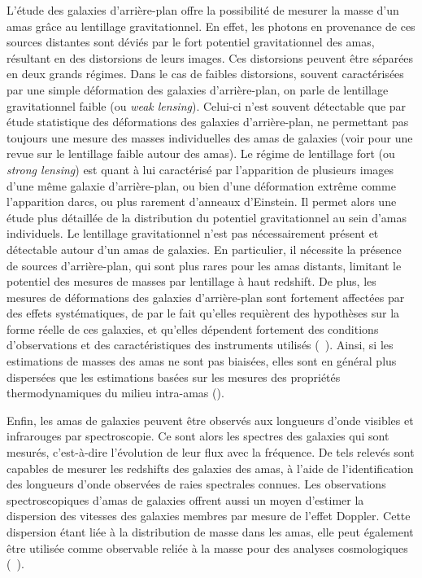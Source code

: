 L'étude des galaxies d'arrière-plan offre la possibilité de mesurer la masse d'un amas grâce au lentillage gravitationnel.
En effet, les photons en provenance de ces sources distantes sont déviés par le fort potentiel gravitationnel des amas, résultant en des distorsions de leurs images.
Ces distorsions peuvent être séparées en deux grands régimes.
Dans le cas de faibles distorsions, souvent caractérisées par une simple déformation des galaxies d'arrière-plan, on parle de lentillage gravitationnel faible (ou \textit{weak lensing}).
Celui-ci n'est souvent détectable que par étude statistique des déformations des galaxies d'arrière-plan, ne permettant pas toujours une mesure des masses individuelles des amas de galaxies (voir \cite{umetsu_clustergalaxy_2020} pour une revue sur le lentillage faible autour des amas).
Le régime de lentillage fort (ou \textit{strong lensing}) est quant à lui caractérisé par l'apparition de plusieurs images d'une même galaxie d'arrière-plan, ou bien d'une déformation extrême comme l'apparition darcs, ou plus rarement d'anneaux d'Einstein.
Il permet alors une étude plus détaillée de la distribution du potentiel gravitationnel au sein d'amas individuels.
Le lentillage gravitationnel n'est pas nécessairement présent et détectable autour d'un amas de galaxies.
En particulier, il nécessite la présence de sources d'arrière-plan, qui sont plus rares pour les amas distants, limitant le potentiel des mesures de masses par lentillage à haut redshift.
De plus, les mesures de déformations des galaxies d'arrière-plan sont fortement affectées par des effets systématiques, de par le fait qu'elles requièrent des hypothèses sur la forme réelle de ces galaxies, et qu'elles dépendent fortement des conditions d'observations et des caractéristiques des instruments utilisés (\eg\ \cite{becker_accuracy_2011,mandelbaum_instrumental_2015,grandis_calibration_2021,sommer_weak_2021}).
Ainsi, si les estimations de masses des amas ne sont pas biaisées\footnotemark, elles sont en général plus dispersées que les estimations basées sur les mesures des propriétés thermodynamiques du milieu intra-amas (\cite{pratt_galaxy_2019,umetsu_clustergalaxy_2020,grandis_calibration_2021}).

Enfin, les amas de galaxies peuvent être observés aux longueurs d'onde visibles et infrarouges par spectroscopie.
Ce sont alors les spectres des galaxies qui sont mesurés, c'est-à-dire l'évolution de leur flux avec la fréquence.
De tels relevés sont capables de mesurer les redshifts des galaxies des amas, à l'aide de l'identification des longueurs d'onde observées de raies spectrales connues.
Les observations spectroscopiques d'amas de galaxies offrent aussi un moyen d'estimer la dispersion des vitesses des galaxies membres par mesure de l'effet Doppler.
Cette dispersion étant liée à la distribution de masse dans les amas, elle peut également être utilisée comme observable reliée à la masse pour des analyses cosmologiques (\eg\ \cite{munari_relation_2013, ferragamo_biases_2020}).

